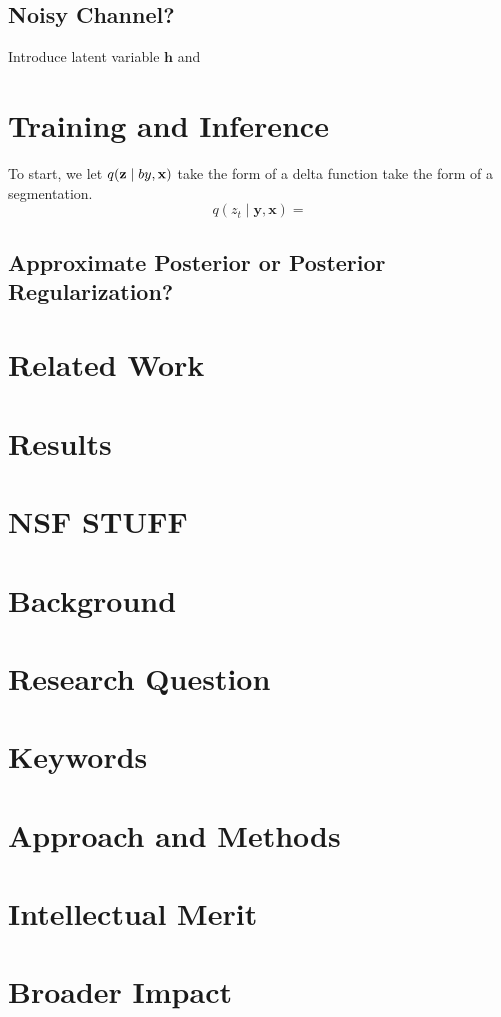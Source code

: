 \documentclass{article}
\newcommand{\bh}{\mathbf{h}}
\newcommand{\bx}{\mathbf{x}}
\newcommand{\by}{\mathbf{y}}
\newcommand{\bz}{\mathbf{z}}
\begin{document}
\subsection{Noisy Channel?}
Introduce latent variable $\bh$ and 

\section{Training and Inference}
To start, we let $q(\bz\mid\\by,\bx)$ take the form of a
delta function take the form of a segmentation.
$$q(z_t\mid\by,\bx)=$$
\subsection{Approximate Posterior or Posterior Regularization?}

\section{Related Work}

\section{Results}

\section{NSF STUFF}
\section{Background}
\section{Research Question}
\section{Keywords}
\section{Approach and Methods}
\section{Intellectual Merit}
\section{Broader Impact}




\end{document}
